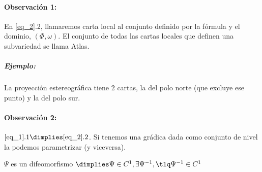  \paragraph{Observación 1:} En \ref{eq_2}.2, llamaremos carta local al conjunto definido por la fórmula y el dominio, $(\Phi,\omega)$. El conjunto de todas las cartas locales que definen una subvariedad se llama Atlas.
 
 \subparagraph{Ejemplo:} 
 
 La proyección estereográfica tiene 2 cartas, la del polo norte (que excluye ese punto) y la del polo sur.
 
 \paragraph{Observación 2:} $\ref{eq_1}.1 \dimplies \ref{eq_2}.2$. Si tenemos una grádica dada como conjunto de nivel la podemos parametrizar (y viceversa).
 
\begin{defn}[Difeomorfismo]
$\Psi$ es un difeomorfismo $\dimplies \Psi\in C^1,\exists \Psi^{-1}, \tlq \Psi^{-1}\in C^1$
\end{defn}
 


